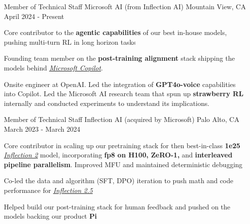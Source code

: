 
\begin{cventries}
  \cventry
    {Member of Technical Staff} %
    {Microsoft AI (from Inflection AI)} %
    {Mountain View, CA} %
    {April 2024 - Present} %
    {
      \begin{cvitems} %
        \item {Core contributor to the \textbf{agentic capabilities} of our best in-house models, pushing multi-turn RL in long horizon tasks}
        \item {Founding team member on the \textbf{post-training alignment} stack shipping the models behind \href{https://copilot.microsoft.com/}{\underline{\textit{Microsoft Copilot}}}.}
        \item {Onsite engineer at OpenAI. Led the integration of \textbf{GPT4o-voice} capabilities into Copilot. Led the Microsoft AI research team that spun up \textbf{strawberry RL} internally and conducted experiments to understand its implications.}
      \end{cvitems}
    }

  \cventry
    {Member of Technical Staff} %
    {Inflection AI (acquired by Microsoft)} %
    {Palo Alto, CA} %
    {March 2023 - March 2024} %
    {
      \begin{cvitems} %
        \item {Core contributor in scaling up our pretraining stack for then best-in-class \textbf{1e25} \href{https://inflection.ai/blog/inflection-2}{\underline{\textit{Inflection 2}}} model, incorporating \textbf{fp8 on H100, ZeRO-1,} and \textbf{interleaved pipeline parallelism}. Improved MFU and maintained deterministic debugging}
        \item {Co-led the data and algorithm (SFT, DPO) iteration to push math and code performance for \href{https://inflection.ai/blog/inflection-2-5}{\underline{\textit{Inflection 2.5}}}}
        \item {Helped build our post-training stack for human feedback and pushed on the models backing our product \textbf{Pi}}
      \end{cvitems}
    }


\end{cventries}
